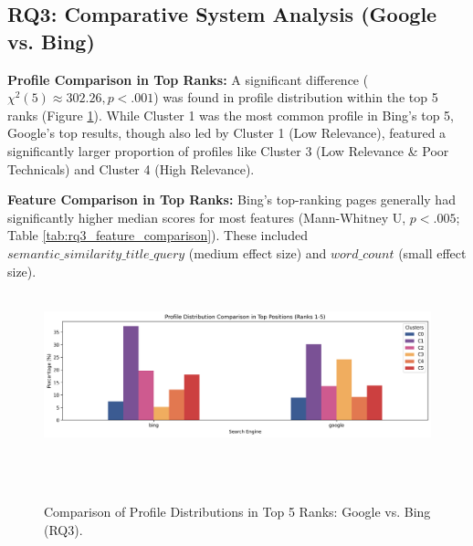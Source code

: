 \documentclass[a4paper,fleqn]{cas-sc}
\begin{document}
\subsection{RQ3: Comparative System Analysis (Google vs. Bing)}
\label{subsec:results_rq3}
\textbf{Profile Comparison in Top Ranks:} A significant difference ($\chi^2(5) \approx 302.26, p < .001$) was found in profile distribution within the top 5 ranks (Figure \ref{fig:rq3_profile_comparison}). While Cluster 1 was the most common profile in Bing's top 5, Google's top results, though also led by Cluster 1 (Low Relevance), 
featured a significantly larger proportion of profiles like Cluster 3 (Low Relevance \& Poor Technicals) and Cluster 4 (High Relevance).

\textbf{Feature Comparison in Top Ranks:} Bing's top-ranking pages generally had significantly higher median scores for most features (Mann-Whitney U, $p < .005$; Table \ref{tab:rq3_feature_comparison}). These included $semantic\_similarity\_title\_query$ (medium effect size) and $word\_count$ (small effect size).

\begin{figure}[htbp!]
    \centering
    \includegraphics[width=1\linewidth]{figs/rq3_profile_comparison.png}
    \caption{Comparison of Profile Distributions in Top 5 Ranks: Google vs. Bing (RQ3).}
    \label{fig:rq3_profile_comparison}
\end{figure}
\end{document}
